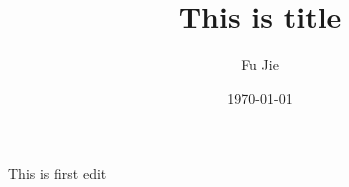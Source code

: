 \documentclass{article}
\title{This is title}
\author{Fu Jie}
\date{\today}
\begin{document}
 
\maketitle
 This is first edit\cite{ar1}
 
 
\end{document}
